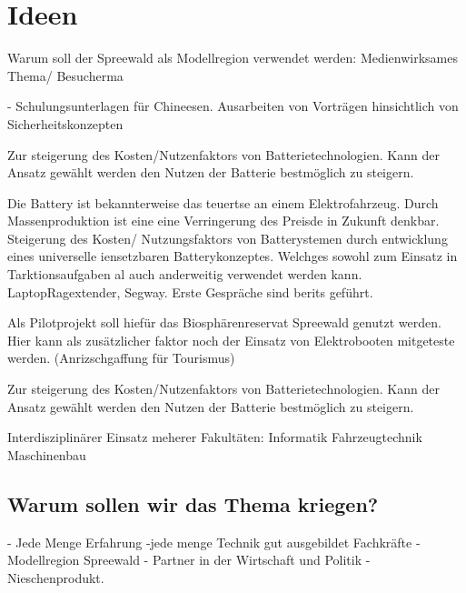 \chapter{Ideen}

Warum soll der Spreewald als Modellregion verwendet werden:
Medienwirksames Thema/ Besucherma


- Schulungsunterlagen für Chineesen. Ausarbeiten von Vorträgen hinsichtlich von Sicherheitskonzepten


Zur steigerung des Kosten/Nutzenfaktors von Batterietechnologien. Kann der Ansatz gewählt werden den Nutzen der Batterie bestmöglich zu steigern. 

Die Battery ist bekannterweise das teuertse an einem Elektrofahrzeug. Durch Massenproduktion ist eine eine Verringerung des Preisde in Zukunft denkbar. Steigerung des Kosten/ Nutzungsfaktors von Batterystemen durch entwicklung eines universelle iensetzbaren Batterykonzeptes. Welchges sowohl zum Einsatz in Tarktionsaufgaben al auch anderweitig verwendet werden kann. LaptopRagextender, Segway. Erste Gespräche sind berits geführt.


Als Pilotprojekt soll hiefür das Biosphärenreservat Spreewald genutzt werden. Hier  kann als zusätzlicher faktor noch der Einsatz von Elektrobooten mitgeteste werden.  (Anrizschgaffung für Tourismus)

Zur steigerung des Kosten/Nutzenfaktors von Batterietechnologien. Kann der Ansatz gewählt werden den Nutzen der Batterie bestmöglich zu steigern. 

Interdisziplinärer Einsatz meherer Fakultäten:
Informatik
Fahrzeugtechnik
Maschinenbau

\section{Warum sollen wir das Thema kriegen?}
- Jede Menge Erfahrung
-jede menge Technik
gut ausgebildet Fachkräfte
- Modellregion Spreewald
- Partner in der Wirtschaft und Politik
- Nieschenprodukt.